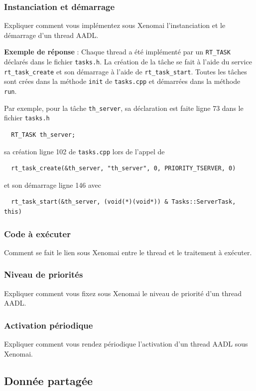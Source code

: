 \documentclass[11pt, a4paper]{paper}
\begin{document}
\subsubsection{Instanciation et démarrage}
 {\color{blue} Expliquer comment vous implémentez sous Xenomai l'instanciation et le démarrage d'un  thread AADL.}
 
 {\color{blue} {\bf Exemple de réponse} : Chaque thread a été implémenté par un {\tt RT\_TASK} déclarés dans le fichier {\tt tasks.h}. La création de la tâche se fait à l'aide du service {\tt rt\_task\_create} et son démarrage à l'aide de {\tt rt\_task\_start}. Toutes les tâches sont crées dans la méthode {\tt init} de {\tt tasks.cpp} et démarrées dans la méthode {\tt run}.

Par exemple, pour la tâche {\tt th\_server}, sa déclaration est faite ligne 73 dans le fichier {\tt tasks.h}
\begin{verbatim}
  RT_TASK th_server;
\end{verbatim}
sa création ligne 102 de {\tt tasks.cpp} lors de l'appel de
\begin{verbatim}
  rt_task_create(&th_server, "th_server", 0, PRIORITY_TSERVER, 0)
\end{verbatim}
et son démarrage ligne 146 avec
\begin{verbatim}
  rt_task_start(&th_server, (void(*)(void*)) & Tasks::ServerTask, this)
\end{verbatim}
}

\subsubsection{Code à exécuter}
 {\color{blue} Comment se fait le lien sous Xenomai entre le thread et le traitement à exécuter.}

\subsubsection{Niveau de priorités}
 {\color{blue} Expliquer comment vous fixez sous Xenomai le niveau de priorité d'un thread AADL.}

\subsubsection{Activation périodique}
 {\color{blue} Expliquer comment vous rendez périodique l'activation d'un thread AADL sous Xenomai.}
 
\subsection{Donnée partagée}
\end{document}
